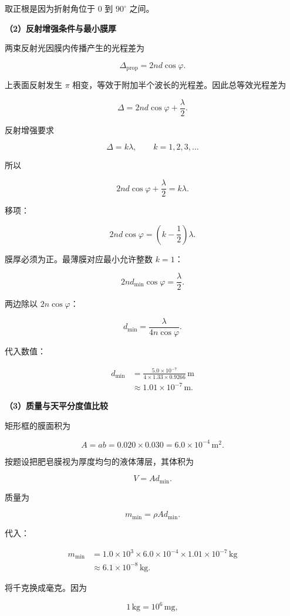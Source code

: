 \documentclass[12pt,a4paper,UTF8]{ctexart}
\begin{document}
取正根是因为折射角位于 \(0\) 到 \(90^\circ\) 之间。

\textbf{（2）反射增强条件与最小膜厚}

两束反射光因膜内传播产生的光程差为

\[\Delta_{\mathrm{prop}}=2nd\cos\varphi.\]

上表面反射发生 \(\pi\)
相变，等效于附加半个波长的光程差。因此总等效光程差为

\[\Delta=2nd\cos\varphi+\frac{\lambda}{2}.\]

反射增强要求

\[\Delta=k\lambda,\qquad k=1,2,3,\ldots\]

所以

\[2nd\cos\varphi+\frac{\lambda}{2}=k\lambda.\]

移项：

\[2nd\cos\varphi
=\left(k-\frac12\right)\lambda.\]

膜厚必须为正。最薄膜对应最小允许整数 \(k=1\)：

\[2nd_{\min}\cos\varphi=\frac{\lambda}{2}.\]

两边除以 \(2n\cos\varphi\)：

\[\boxed{
d_{\min}=\frac{\lambda}{4n\cos\varphi}
}.\]

代入数值：

\[\begin{aligned}
d_{\min}
&=\frac{5.0\times10^{-7}}
{4\times1.33\times0.9266}\,\mathrm m\\
&\approx1.01\times10^{-7}\,\mathrm m.
\end{aligned}\]

\textbf{（3）质量与天平分度值比较}

矩形框的膜面积为

\[A=ab
=0.020\times0.030
=6.0\times10^{-4}\,\mathrm{m^2}.\]

按题设把肥皂膜视为厚度均匀的液体薄层，其体积为

\[V=Ad_{\min}.\]

质量为

\[m_{\min}=\rho Ad_{\min}.\]

代入：

\[\begin{aligned}
m_{\min}
&=1.0\times10^3
\times6.0\times10^{-4}
\times1.01\times10^{-7}\,\mathrm{kg}\\
&\approx6.1\times10^{-8}\,\mathrm{kg}.
\end{aligned}\]

将千克换成毫克。因为

\[1\,\mathrm{kg}=10^6\,\mathrm{mg},\]
\end{document}
